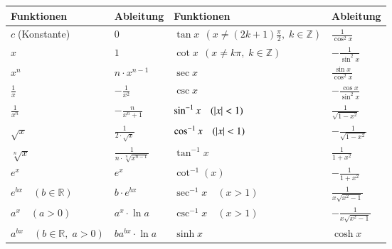 \begin{tabular}{|l|l||l|l|}
    \hline
    Funktionen & Ableitung & Funktionen & Ableitung \\
    \hline
    $ c \;$(Konstante)                          & $ 0 $                                     & $\tan x \; \, (x \neq (2k+1)\frac{\pi}{2}, \; k \in \mathbb{Z})$  & $ \frac{1}{\cos^2 x}  $ \\
    $ x $                                       & $ 1 $                                     & $\cot x \; \, (x \neq k\pi, \; k \in \mathbb{Z})$                 & $ -\frac{1}{\sin^2 x} $ \\
    $ x^n $                                     & $ n \cdot x^{n-1} $                       & $\sec x$                                                          & $ \frac{\sin x}{\cos^2 x} $ \\
    $ \frac{1}{x} $                             & $ -\frac{1}{x^2} $                        & $\csc x$                                                          & $ -\frac{\cos x}{\sin^2 x} $ \\
    $ \frac{1}{x^n} $                           & $ -\frac{n}{x^n+1} $                      & $\sin^{-1} x \quad  (\left|x\right| < 1)$                                & $ \frac{1}{\sqrt{1-x^2}} $ \\
    $ \sqrt{x} $                                & $ \frac{1}{2 \cdot \sqrt{x}} $            & $\cos^{-1} x \quad  (\left|x\right| < 1)$                                & $ -\frac{1}{\sqrt{1-x^2}} $ \\
    $ \sqrt[n]{x} $                             & $ \frac{1}{n \cdot \sqrt[n]{x^{n-1}}} $   & $\tan^{-1} x$                                                     & $ \frac{1}{1+x^2} $ \\
    $ e^x $                                     & $ e^x$                                    & $\cot^{-1} (x)$                                                   & $ -\frac{1}{1+x^2} $ \\
    $ e^{bx} \quad (b \in \mathbb{R}) $         & $ b \cdot e^{bx} $                        & $\sec^{-1} x \quad  (x > 1)$                                      & $ \frac{1}{x\sqrt{x^2-1}} $ \\
    $ a^x \quad (a > 0)$                        & $ a^x \cdot \ln a $                       & $\csc^{-1} x \quad  (x > 1)$                                      & $ -\frac{1}{x\sqrt{x^2-1}} $ \\
    $ a^{bx} \quad (b \in \mathbb{R},\; a > 0)$ & $ ba^{bx} \cdot \ln a $                   & $\sinh x $                                                        & $ \cosh x $ \\

\end{tabular}
